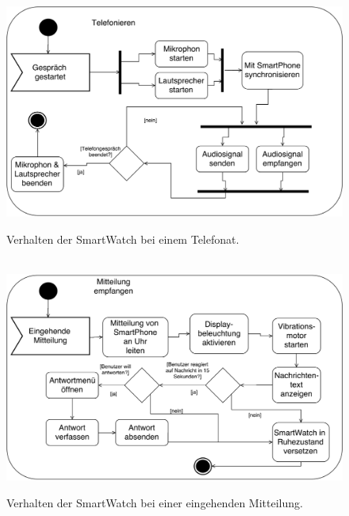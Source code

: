 \begin{appendices}
\begin{figure}[h]
\centering\
\includegraphics[width=\textwidth]{img/activityTelefonieren}
\caption{Verhalten der SmartWatch bei einem Telefonat.}\label{fig:activityTelefonieren}
\end{figure}

\begin{figure}[h]
\centering\
\includegraphics[width=\textwidth]{img/activityMitteilung}
\caption{Verhalten der SmartWatch bei einer eingehenden Mitteilung.}\label{fig:activityMitteilung}
\end{figure}


\end{appendices}
